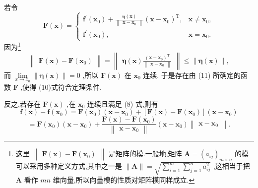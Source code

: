 若令
\[
\mathbf{F}\left( \mathbf{x}\right)  = \left\{  \begin{array}{ll} {\mathbf{f}}^{\prime }\left( {\mathbf{x}}_{0}\right)  + \frac{\mathbf{\eta }\left( \mathbf{x}\right) }{\begin{Vmatrix}\mathbf{x} - {\mathbf{x}}_{0}\end{Vmatrix}}{\left( \mathbf{x} - {\mathbf{x}}_{0}\right) }^{\mathrm{T}}, & \mathbf{x} \neq  {\mathbf{x}}_{0}, \\  {\mathbf{f}}^{\prime }\left( {\mathbf{x}}_{0}\right) , & \mathbf{x} = {\mathbf{x}}_{0}. \end{array}\right.  \tag{11}
\]
因为\footnote{这里 \(\begin{Vmatrix}{\mathbf{F}\left( \mathbf{x}\right)  - \mathbf{F}\left( {\mathbf{x}}_{0}\right) }\end{Vmatrix}\) 是矩阵的模.一般地,矩阵 \(\mathbf{A} = {\left( {a}_{ij}\right) }_{m \times  n}\) 的模可以采用多种定义方式,其中之一是 \(\parallel \mathbf{A}\parallel  = \sqrt{\mathop{\sum }\limits_{{i = 1}}^{m}\mathop{\sum }\limits_{{j = 1}}^{n}{a}_{ij}^{2}}\) ,这相当于把 \(\mathbf{A}\) 看作 \({mn}\) 维向量,所以向量模的性质对矩阵模同样成立.}
\[
\begin{Vmatrix}{\mathbf{F}\left( \mathbf{x}\right)  - \mathbf{F}\left( {\mathbf{x}}_{0}\right) }\end{Vmatrix} = \begin{Vmatrix}{\mathbf{\eta }\left( \mathbf{x}\right) \frac{{\left( \mathbf{x} - {\mathbf{x}}_{0}\right) }^{\mathrm{T}}}{\begin{Vmatrix}\mathbf{x} - {\mathbf{x}}_{0}\end{Vmatrix}}}\end{Vmatrix} \leq  \parallel \mathbf{\eta }\left( \mathbf{x}\right) \parallel ,
\]
而 \(\mathop{\lim }\limits_{{x \rightarrow  {x}_{0}}}\parallel \mathbf{\eta }\left( \mathbf{x}\right) \parallel  = 0\) ,所以 \(\mathbf{F}\left( \mathbf{x}\right)\) 在 \({\mathbf{x}}_{0}\) 连续. 于是存在由 (11) 所确定的函数 \(\mathbf{F}\) ,使得 (10)式符合定理条件.

反之,若存在 \(\mathbf{F}\left( \mathbf{x}\right)\) ,在 \({\mathbf{x}}_{0}\) 连续且满足 (8) 式,则有
\[
\mathbf{f}\left( \mathbf{x}\right)  - \mathbf{f}\left( {\mathbf{x}}_{0}\right)  = \mathbf{F}\left( {\mathbf{x}}_{0}\right) \left( {\mathbf{x} - {\mathbf{x}}_{0}}\right)  + \left\lbrack  {\mathbf{F}\left( \mathbf{x}\right)  - \mathbf{F}\left( {\mathbf{x}}_{0}\right) }\right\rbrack  \left( {\mathbf{x} - {\mathbf{x}}_{0}}\right)
\]
\[
= \mathbf{F}\left( {\mathbf{x}}_{0}\right) \left( {\mathbf{x} - {\mathbf{x}}_{0}}\right)  + \frac{\mathbf{F}\left( \mathbf{x}\right)  - \mathbf{F}\left( {\mathbf{x}}_{0}\right) }{\begin{Vmatrix}\mathbf{x} - {\mathbf{x}}_{0}\end{Vmatrix}}\left( {\mathbf{x} - {\mathbf{x}}_{0}}\right) \begin{Vmatrix}{\mathbf{x} - {\mathbf{x}}_{0}}\end{Vmatrix}.
\]

